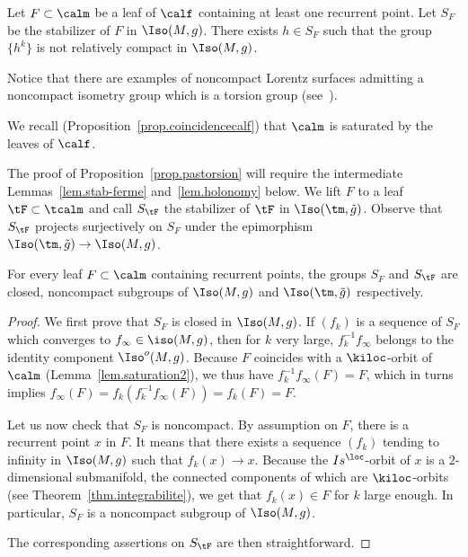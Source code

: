 \begin{prop}\label{prop.pastorsion}
Let $F \subset \calm$ be a leaf of $\calf$ containing at least one recurrent point. Let $S_F$ be the stabilizer of $F$ in $\Iso(M,g)$. There exists $h \in S_{F}$ such that the group $\{ h^k \}$ is not relatively compact in $\Iso(M,g)$.
\end{prop}

Notice that there are examples of noncompact Lorentz surfaces admitting a noncompact isometry group which is a torsion group (see~\cite[Remarque 4.12]{mounoud}).


We recall (Proposition~\ref{prop.coincidencecalf}) that $\calm$ is saturated by the leaves of $\calf$.


The proof of Proposition~\ref{prop.pastorsion} will require the intermediate Lemmas~\ref{lem.stab-ferme} and~\ref{lem.holonomy} below. We lift $F$ to a leaf $\tF \subset \tcalm$ and call ${S}_{\tF}$ the stabilizer of $\tF$ in $\Iso(\tm,\tilde{g})$. Observe that ${S}_{\tF}$ projects surjectively on $S_F$ under the epimorphism $\Iso(\tm, \tilde{g}) \to \Iso(M,g)$.
\begin{lemm}\label{lem.stab-ferme}
For every leaf $F \subset \calm$ containing recurrent points, the groups $S_F$ and $S_{\tF}$ are closed, noncompact subgroups of $\Iso(M,g)$ and $\Iso(\tm,\tilde{g})$ respectively.
\end{lemm}

\begin{proof}
We first prove that $S_F$ is closed in $\Iso(M,g)$.
If $(f_k)$ is a sequence of $S_F$ which converges to $f_{\infty} \in \iso(M,g)$, then for $k$ very large, $f_k^{-1}f_{\infty}$ belongs to the identity component $\Iso^o(M,g)$. Because $F$ coincides with a $\kiloc$-orbit of $\calm$ (Lemma~\ref{lem.saturation2}), we thus have $f_k^{-1}f_{\infty}(F)=F$, which in turns implies $f_{\infty}(F)=f_k(f_k^{-1}f_{\infty}(F))=f_k(F)=F$.

Let us now check that $S_F$ is noncompact. By assumption on $F$, there is a recurrent point $x$ in $F$. It means that there exists a sequence $(f_k)$ tending to infinity in $\Iso(M,g)$ such that $f_k(x) \to x$. Because the $\\Is^{\loc}$-orbit of $x$ is a $2$-dimensional submanifold, the connected components of which are $\kiloc$-orbits (see Theorem~\ref{thm.integrabilite}), we get that $f_k(x) \in F$ for $k$ large enough. In particular, $S_F$ is a noncompact subgroup of $\Iso(M,g)$.

The corresponding assertions on $S_{\tF}$ are then straightforward.
\end{proof}




